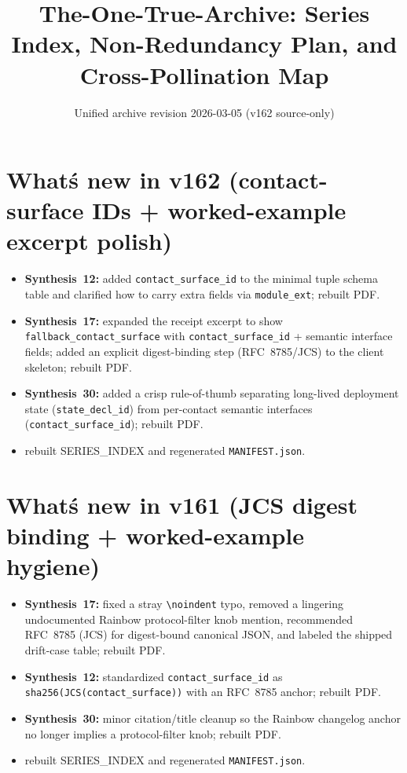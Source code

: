 \documentclass[11pt]{article}
\title{The-One-True-Archive: Series Index, Non-Redundancy Plan, and Cross-Pollination Map}
\author{}
\date{Unified archive revision 2026-03-05 (v162 source-only)}
\begin{document}
\maketitle

\section{What\'s new in v162 (contact-surface IDs + worked-example excerpt polish)}
\begin{itemize}[leftmargin=*]
\item \textbf{Synthesis~12:} added \texttt{contact\_surface\_id} to the minimal tuple schema table and clarified how to carry extra fields via \texttt{module\_ext}; rebuilt PDF.
\item \textbf{Synthesis~17:} expanded the receipt excerpt to show \texttt{fallback\_contact\_surface} with \texttt{contact\_surface\_id} + semantic interface fields; added an explicit digest-binding step (RFC~8785/JCS) to the client skeleton; rebuilt PDF.
\item \textbf{Synthesis~30:} added a crisp rule-of-thumb separating long-lived deployment state (\texttt{state\_decl\_id}) from per-contact semantic interfaces (\texttt{contact\_surface\_id}); rebuilt PDF.
\item rebuilt SERIES\_INDEX and regenerated \texttt{MANIFEST.json}.
\end{itemize}

\section{What\'s new in v161 (JCS digest binding + worked-example hygiene)}
\begin{itemize}[leftmargin=*]
\item \textbf{Synthesis~17:} fixed a stray \texttt{\textbackslash noindent} typo, removed a lingering undocumented Rainbow protocol-filter knob mention, recommended RFC~8785 (JCS) for digest-bound canonical JSON, and labeled the shipped drift-case table; rebuilt PDF.
\item \textbf{Synthesis~12:} standardized \texttt{contact\_surface\_id} as \texttt{sha256(JCS(contact\_surface))} with an RFC~8785 anchor; rebuilt PDF.
\item \textbf{Synthesis~30:} minor citation/title cleanup so the Rainbow changelog anchor no longer implies a protocol-filter knob; rebuilt PDF.
\item rebuilt SERIES\_INDEX and regenerated \texttt{MANIFEST.json}.
\end{itemize}
\end{document}
